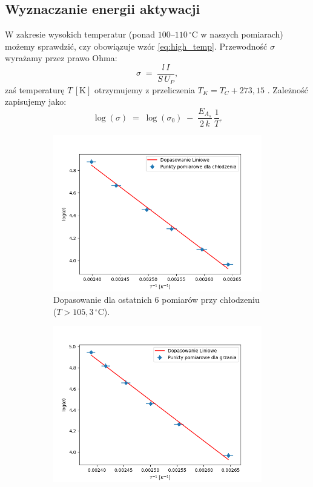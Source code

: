 \documentclass[12pt]{article}
\begin{document}
\subsection{Wyznaczanie energii aktywacji}
W zakresie wysokich temperatur (ponad $100$--$110\,^\circ\mathrm{C}$ w naszych pomiarach) możemy sprawdzić, czy obowiązuje wzór \eqref{eq:high_temp}. Przewodność $\sigma$ wyrażamy przez prawo Ohma:
\[
    \sigma \;=\; \frac{l\,I}{S\,U_P},
\]
zaś temperaturę $T\,[\mathrm{K}]$ otrzymujemy z przeliczenia $T_K = T_C + 273{,}15$ \cite{kelvin}.  
Zależność zapisujemy jako:
\[
    \log(\sigma) \;=\; \log(\sigma_0)\;-\;\frac{E_{A_s}}{2\,k}\,\frac{1}{T}.
\]

\begin{figure}[H]
  \centering
  \begin{subfigure}[b]{0.45\textwidth}
    \includegraphics[width=\textwidth]{temp_cooling_fit}
    \caption{Dopasowanie dla ostatnich 6 pomiarów przy chłodzeniu ($T>105{,}3\,^\circ\mathrm{C}$).}
    \label{fig:temp_cooling_fit}
  \end{subfigure}
  \hfill
  \begin{subfigure}[b]{0.45\textwidth}
    \includegraphics[width=\textwidth]{temp_heating_fit}

\end{subfigure}
\end{figure}
\end{document}
